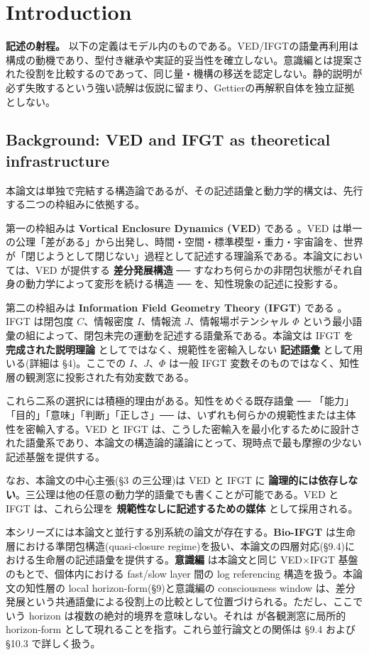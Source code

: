 \section{Introduction}

\noindent\textbf{記述の射程。} 以下の定義はモデル内のものである。VED/IFGTの語彙再利用は構成の動機であり、型付き継承や実証的妥当性を確立しない。意識編とは提案された役割を比較するのであって、同じ量・機構の移送を認定しない。静的説明が必ず失敗するという強い読解は仮説に留まり、Gettierの再解釈自体を独立証拠としない。



\subsection{Background: VED and IFGT as theoretical infrastructure}


本論文は単独で完結する構造論であるが、その記述語彙と動力学的構文は、先行する二つの枠組みに依拠する。

第一の枠組みは \textbf{Vortical Enclosure Dynamics (VED)} である \citep{VEDVol1,VEDVol2,VEDVol3,VEDVol4}。VED は単一の公理「差がある」から出発し、時間・空間・標準模型・重力・宇宙論を、世界が「閉じようとして閉じない」過程として記述する理論系である。本論文においては、VED が提供する \textbf{差分発展構造} ── すなわち何らかの非閉包状態がそれ自身の動力学によって変形を続ける構造 ── を、知性現象の記述に投影する。

第二の枠組みは \textbf{Information Field Geometry Theory (IFGT)} である \citep{IFGT}。IFGT は閉包度 $C$、情報密度 $I$、情報流 $J$、情報場ポテンシャル $\Phi$ という最小語彙の組によって、閉包未完の運動を記述する語彙系である。本論文は IFGT を \textbf{完成された説明理論} としてではなく、規範性を密輸入しない \textbf{記述語彙} として用いる(詳細は \S{}4)。ここでの $I$、$J$、$\Phi$ は一般 IFGT 変数そのものではなく、知性層の観測窓に投影された有効変数である。

これら二系の選択には積極的理由がある。知性をめぐる既存語彙 ── 「能力」「目的」「意味」「判断」「正しさ」── は、いずれも何らかの規範性または主体性を密輸入する。VED と IFGT は、こうした密輸入を最小化するために設計された語彙系であり、本論文の構造論的議論にとって、現時点で最も摩擦の少ない記述基盤を提供する。

なお、本論文の中心主張(\S{}3 の三公理)は VED と IFGT に \textbf{論理的には依存しない}。三公理は他の任意の動力学的語彙でも書くことが可能である。VED と IFGT は、これら公理を \textbf{規範性なしに記述するための媒体} として採用される。

本シリーズには本論文と並行する別系統の論文が存在する。\textbf{Bio-IFGT} \citep{BioIFGT} は生命層における準閉包構造(quasi-closure regime)を扱い、本論文の四層対応(\S{}9.4)における生命層の記述語彙を提供する。\textbf{意識編} \citep{Consciousness} は本論文と同じ VED×IFGT 基盤のもとで、個体内における fast/slow layer 間の log referencing 構造を扱う。本論文の知性層の local horizon-form(\S{}9)と意識編の consciousness window は、差分発展という共通語彙による役割上の比較として位置づけられる。ただし、ここでいう horizon は複数の絶対的境界を意味しない。それは \DH{} が各観測窓に局所的 horizon-form として現れることを指す。これら並行論文との関係は \S{}9.4 および \S{}10.3 で詳しく扱う。

